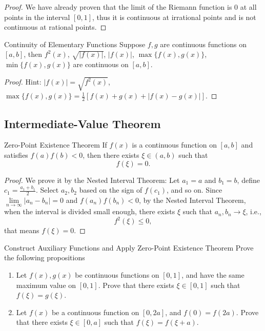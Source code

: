 \begin{proof}
  We have already proven that the limit of the Riemann function is $0$
  at all points in the interval $[0, 1]$,
  thus it is continuous at irrational points and is not continuous at rational points.
\end{proof}

\begin{proposition}{Continuity of Elementary Functions}{}
  Suppose $f, g$ are continuous functions on $[a, b]$,
  then $f^2(x)$, $\sqrt{|f(x)|}$, $|f(x)|$, $\max\{f(x), g(x)\}$, $\min \{f(x), g(x)\}$
  are continuous on $[a, b]$.
\end{proposition}

\begin{proof}
  Hint: $|f(x)| = \sqrt{f^2(x)}$,
  $\max \{f(x), g(x)\} = \frac{1}{2} \left[f(x) + g(x) + |f(x) - g(x)| \right]$.
\end{proof}

\subsection{Intermediate-Value Theorem}

\begin{theorem}{Zero-Point Existence Theorem}{}
  If $f(x)$ is a continuous function on $[a, b]$ and satisfies $f(a)f(b) < 0$,
  then there exists $\xi \in (a, b)$ such that
  \begin{equation}
    f(\xi) = 0.
  \end{equation}
\end{theorem}

\begin{proof}
  We prove it by the Nested Interval Theorem:
  Let $a_1 = a$ and $b_1 = b$, define $c_1 = \frac{a_1 + b_1}{2}$.
  Select $a_2, b_2$ based on the sign of $f(c_1)$,
  and so on.
  Since $\lim \limits _{n \rightarrow \infty} |a_n - b_n| = 0$ and $f(a_n)f(b_n)
  < 0$, by the Nested Interval Theorem,
  when the interval is divided small enough,
  there exists $\xi$ such that $a_n, b_n \rightarrow \xi$, i.e.,
  \begin{equation}
    f^2(\xi) \leq 0,
  \end{equation}
  that means $f(\xi) = 0$.
\end{proof}

\begin{example}{Construct Auxiliary Functions and Apply Zero-Point Existence Theorem}{}
  Prove the following propositions
  \begin{enumerate}
  \item Let $f(x), g(x)$ be continuous functions on $[0, 1]$,
    and have the same maximum value on $[0, 1]$.
    Prove that there exists $\xi \in [0, 1]$ such that $f(\xi) = g(\xi)$.
  \item Let $f(x)$ be a continuous function on $[0, 2a]$,
    and $f(0) = f(2a)$. Prove that there exists $\xi \in [0, a]$ such that
    $f(\xi) = f(\xi + a)$.
  \end{enumerate}
\end{example}


